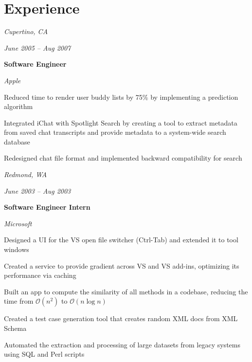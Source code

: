     
    \section{Experience}



        
        \begin{twocolentry}{
        \textit{Cupertino, CA}    
            
        \textit{June 2005 – Aug 2007}}
            \textbf{Software Engineer}
            
            \textit{Apple}
        \end{twocolentry}

        \vspace{0.10 cm}
        \begin{onecolentry}
            \begin{highlights}
                \item Reduced time to render user buddy lists by 75\% by implementing a prediction algorithm
                \item Integrated iChat with Spotlight Search by creating a tool to extract metadata from saved chat transcripts and provide metadata to a system-wide search database
                \item Redesigned chat file format and implemented backward compatibility for search
            \end{highlights}
        \end{onecolentry}


        \vspace{0.2 cm}

        \begin{twocolentry}{
        \textit{Redmond, WA}    
            
        \textit{June 2003 – Aug 2003}}
            \textbf{Software Engineer Intern}
            
            \textit{Microsoft}
        \end{twocolentry}

        \vspace{0.10 cm}
        \begin{onecolentry}
            \begin{highlights}
                \item Designed a UI for the VS open file switcher (Ctrl-Tab) and extended it to tool windows
                \item Created a service to provide gradient across VS and VS add-ins, optimizing its performance via caching
                \item Built an app to compute the similarity of all methods in a codebase, reducing the time from $\mathcal{O}(n^2)$ to $\mathcal{O}(n \log n)$
                \item Created a test case generation tool that creates random XML docs from XML Schema
                \item Automated the extraction and processing of large datasets from legacy systems using SQL and Perl scripts
            \end{highlights}
        \end{onecolentry}



